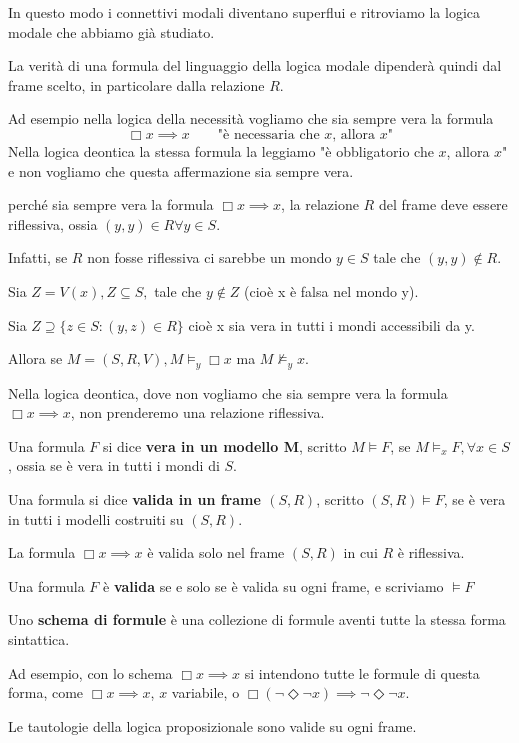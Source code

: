 \documentclass[../main.tex]{subfiles}
\begin{document}
In questo modo i connettivi modali diventano superflui e ritroviamo la logica modale che abbiamo già studiato.

La verità di una formula del linguaggio della logica modale dipenderà quindi dal frame scelto, in particolare dalla relazione $R$.

Ad esempio nella logica della necessità vogliamo che sia sempre vera la formula
\begin{equation*}
    \Box x \implies x \qquad \text{"è necessaria che $x$, allora $x$"}
\end{equation*}
Nella logica deontica la stessa formula la leggiamo "è obbligatorio che $x$, allora $x$" e non vogliamo che questa affermazione sia sempre vera.

perché sia sempre vera la formula $\Box x \implies x$, la relazione $R$ del frame deve essere riflessiva, ossia $(y,y) \in R \forall y \in S$.

Infatti, se $R$ non fosse riflessiva ci sarebbe un mondo $y \in S$ tale che $(y,y) \notin R$.

Sia $Z = V(x), Z \subseteq S,$ tale che $y \notin Z$ (cioè x è falsa nel mondo y).

Sia $Z \supseteq \{z \in S : (y,z) \in R\}$ cioè x sia vera in tutti i mondi accessibili da y.

Allora se $M = (S, R, V), M \vDash_y \Box x$ ma $M \nvDash_y x$.

Nella logica deontica, dove non vogliamo che sia sempre vera la formula $\Box x \implies x$, non prenderemo una relazione riflessiva.
\begin{definition}
    Una formula $F$ si dice \textbf{vera in un modello M}, scritto \textbf{$M \vDash F$}, se $M \vDash_x F, \forall x \in S$, ossia se è vera in tutti i mondi di $S$.
\end{definition}
\begin{definition}
    Una formula si dice \textbf{valida in un frame $(S,R)$}, scritto $(S,R) \vDash F$, se è vera in tutti i modelli costruiti su $(S,R)$.
\end{definition}
\begin{example}
    La formula $\Box x \implies x$ è valida solo nel frame $(S,R)$ in cui $R$ è riflessiva.
\end{example}
\begin{definition}
    Una formula $F$ è \textbf{valida} se e solo se è valida su ogni frame, e scriviamo $\vDash F$
\end{definition}
\begin{definition}
    Uno \textbf{schema di formule} è una collezione di formule aventi tutte la stessa forma sintattica.

    Ad esempio, con lo schema $\Box x \implies x$ si intendono tutte le formule di questa forma, come $\Box x \implies x$, $x$ variabile, o $\Box (\neg \Diamond \neg x) \implies \neg \Diamond \neg x$.
\end{definition}
Le tautologie della logica proposizionale sono valide su ogni frame.
\end{document}
